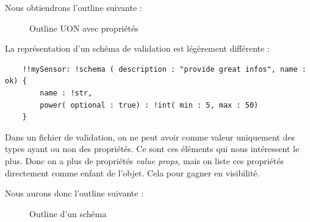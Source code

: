 \documentclass[
    iict, %
    il, %
]{heig-tb}
\begin{document}
Nous obtiendrons l'outline suivante :

\begin{figure}[!h]
    \begin{center}
    \end{center}
    \caption[Outline UON avec propriétés]{\label{uon-payload-outline-with-properties} Outline UON avec propriétés}
\end{figure}

La représentation d'un schéma de validation est légèrement différente :

\begin{lstlisting}
    !!mySensor: !schema ( description : "provide great infos", name : ok) {
        name : !str,
        power( optional : true) : !int( min : 5, max : 50)
    }
\end{lstlisting}

Dans un fichier de validation, on ne peut avoir comme valeur uniquement des types ayant ou non des propriétés. Ce sont ces éléments qui nous intéressent le plus.
Donc on a plus de propriétés \emph{value props}, mais on liste ces propriétés directement comme enfant de l'objet. Cela pour gagner en visibilité.

Nous aurons donc l'outline suivante :

\begin{figure}[!h]
    \begin{center}
    \end{center}
    \caption[Outline d'un schéma]{\label{uon-schema-outline} Outline d'un schéma}
\end{figure}
\end{document}
